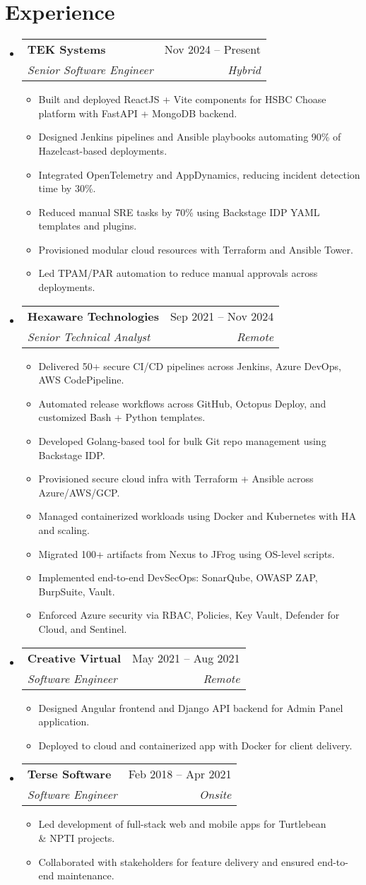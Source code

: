 \documentclass[letterpaper, 11pt]{article}
\makeatletter
\newcommand{\resumeItem}[1]{\item \small {#1 \vspace{-3pt}}}
\newcommand{\resumeSubheading}[4]{
  \vspace{-2pt}\item
    \begin{tabular*}{0.99\textwidth}[t]{l@{\extracolsep{\fill}}r}
      \textbf{#1} & #2 \\
      \textit{\small#3} & \textit{\small #4} \\
    \end{tabular*}\vspace{-7pt}
}
\newcommand{\resumeItemListStart}{\begin{itemize}[leftmargin=0.25in, label={\textbullet}]}
\newcommand{\resumeItemListEnd}{\end{itemize}\vspace{-10pt}}
\newcommand{\resumeSubHeadingListStart}{\begin{itemize}[leftmargin=0.15in, label={}]}\newcommand{\resumeSubHeadingListEnd}{\end{itemize}}
\makeatother
\begin{document}
\section{Experience}
\resumeSubHeadingListStart{}
\resumeSubheading{TEK Systems}{Nov 2024 -- Present}{Senior Software Engineer}{Hybrid}
\resumeItemListStart{}
\resumeItem{Built and deployed ReactJS + Vite components for HSBC Choase platform with FastAPI + MongoDB backend.}
\resumeItem{Designed Jenkins pipelines and Ansible playbooks automating 90\% of Hazelcast-based deployments.}
\resumeItem{Integrated OpenTelemetry and AppDynamics, reducing incident detection time by 30\%.}
\resumeItem{Reduced manual SRE tasks by 70\% using Backstage IDP YAML templates and plugins.}
\resumeItem{Provisioned modular cloud resources with Terraform and Ansible Tower.}
\resumeItem{Led TPAM/PAR automation to reduce manual approvals across deployments.}
\resumeItemListEnd{}

\vspace{5pt} 

\resumeSubheading{Hexaware Technologies}{Sep 2021 -- Nov 2024}{Senior Technical Analyst}{Remote}
\resumeItemListStart{}
\resumeItem{Delivered 50+ secure CI/CD pipelines across Jenkins, Azure DevOps, AWS CodePipeline.}
\resumeItem{Automated release workflows across GitHub, Octopus Deploy, and customized Bash + Python templates.}
\resumeItem{Developed Golang-based tool for bulk Git repo management using Backstage IDP.}
\resumeItem{Provisioned secure cloud infra with Terraform + Ansible across Azure/AWS/GCP.}
\resumeItem{Managed containerized workloads using Docker and Kubernetes with HA and scaling.}
\resumeItem{Migrated 100+ artifacts from Nexus to JFrog using OS-level scripts.}
\resumeItem{Implemented end-to-end DevSecOps: SonarQube, OWASP ZAP, BurpSuite, Vault.}
\resumeItem{Enforced Azure security via RBAC, Policies, Key Vault, Defender for Cloud, and Sentinel.}
\resumeItemListEnd{}
\vspace{5pt} 
\resumeSubheading{Creative Virtual}{May 2021 -- Aug 2021}{Software Engineer}{Remote}
\resumeItemListStart{}
\resumeItem{Designed Angular frontend and Django API backend for Admin Panel application.}
\resumeItem{Deployed to cloud and containerized app with Docker for client delivery.}
\resumeItemListEnd{}
\vspace{5pt} 
\resumeSubheading{Terse Software}{Feb 2018 -- Apr 2021}{Software Engineer}{Onsite}
\resumeItemListStart{}
\resumeItem{Led development of full-stack web and mobile apps for Turtlebean \\& NPTI projects.}
\resumeItem{Collaborated with stakeholders for feature delivery and ensured end-to-end maintenance.}
\resumeItemListEnd{}
\resumeSubHeadingListEnd{}
\end{document}
